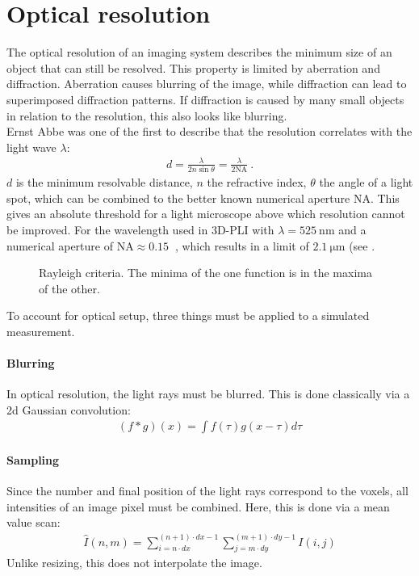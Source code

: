 \section{Optical resolution}
\label{sec:opticalResolution}
%
The optical resolution of an imaging system describes the minimum size of an object that can still be resolved.
This property is limited by aberration and diffraction.
Aberration causes blurring of the image, while diffraction can lead to superimposed diffraction patterns.
If diffraction is caused by many small objects in relation to the resolution, this also looks like blurring.
\\
%
Ernst Abbe was one of the first to describe that the resolution correlates with the light wave $\lambda$:
\begin{align}
d=\frac{ \lambda}{2 n \sin \theta} = \frac{\lambda}{2\mathrm{NA}} \> .
\end{align}
$d$ is the minimum resolvable distance, $n$ the refractive index, $\theta$ the angle of a light spot, which can be combined to the better known numerical aperture $\mathrm{NA}$.
This gives an absolute threshold for a light microscope above which resolution cannot be improved.
For the wavelength used in \ac{3D-PLI} with $\lambda = \SI{525}{\nano\meter}$ and a numerical aperture of $\mathrm{NA} \approx \SI{0.15}{}$ , which results in a limit of $\SI{2.1}{\micro\meter}$ (see \cite{MenzelDissertation}.
%
\begin{figure}[!t]
\setlength{\tikzwidth}{0.45\textwidth}
\centering
\caption[Raylay criterium]{Rayleigh criteria. The minima of the one function is in the maxima of the other.}
\label{fig:rayleigh}
\end{figure}
%
To account for optical setup, three things must be applied to a simulated measurement.
%
\paragraph{Blurring}
In optical resolution, the light rays must be blurred.
This is done classically via a 2d Gaussian convolution:
\begin{align}
    (f * g)(x) = \int f(\tau)g(x-\tau)d\tau
\end{align}
%
\paragraph{Sampling}
Since the number and final position of the light rays correspond to the voxels, all intensities of an image pixel must be combined.
Here, this is done via a mean value scan:
\begin{align}
    \hat{I}(n,m) = \sum_{i=n \cdot dx}^{(n+1) \cdot dx-1}\sum_{j=m \cdot dy}^{(m+1) \cdot dy-1} I(i,j)
\end{align}
Unlike resizing, this does not interpolate the image.
%
